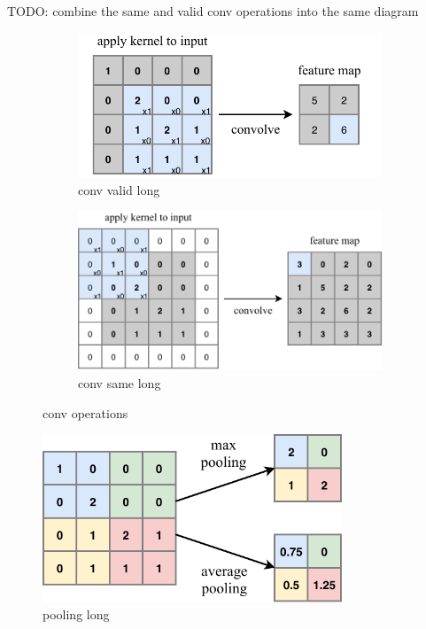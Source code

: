 TODO: combine the same and valid conv operations into the same diagram
\begin{figure} %
    \centering
    \begin{subfigure}[b]{0.71\textwidth}
        \centering
        \includegraphics[width=\textwidth]{diagrams/6-cvn/conv_valid.pdf}
        \caption{conv valid long}
        \label{fig:conv_valid}
    \end{subfigure}
    \hfill
    \begin{subfigure}[b]{0.9\textwidth}
        \centering
        \includegraphics[width=\textwidth]{diagrams/6-cvn/conv_same.pdf}
        \caption{conv same long}
        \label{fig:conv_same}
    \end{subfigure}
    \caption{conv operations}
    \label{fig:conv_operations}
\end{figure} %


\begin{figure} %
    \includegraphics[width=0.8\textwidth]{diagrams/6-cvn/pooling.pdf}
    \caption[pooling short]
    {pooling long}
    \label{fig:pooling}
\end{figure} %


